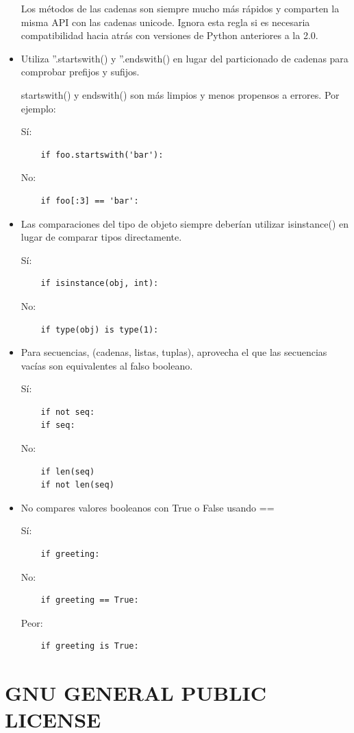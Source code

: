 \documentclass[a4paper,11pt,oneside]{book}
\begin{document}
\begin{itemize}
Los métodos de las cadenas son siempre mucho más rápidos y comparten la misma API con las cadenas unicode. Ignora esta regla si es necesaria compatibilidad hacia atrás con versiones de Python anteriores a la 2.0.

\item Utiliza ''.startswith() y ''.endswith() en lugar del particionado de cadenas para comprobar prefijos y sufijos.

startswith() y endswith() son más limpios y menos propensos a errores. Por ejemplo:

Sí:
\begin{lstlisting}
    if foo.startswith('bar'):
\end{lstlisting}
No:
\begin{lstlisting}
    if foo[:3] == 'bar':
\end{lstlisting}
\item Las comparaciones del tipo de objeto siempre deberían utilizar isinstance() en lugar de comparar tipos directamente.

Sí:
\begin{lstlisting}
    if isinstance(obj, int):
\end{lstlisting}
No:
\begin{lstlisting}
    if type(obj) is type(1):
\end{lstlisting}

\item Para secuencias, (cadenas, listas, tuplas), aprovecha el que las secuencias vacías son equivalentes al falso booleano.

Sí:
\begin{lstlisting}
    if not seq:
    if seq:
\end{lstlisting}
No:
\begin{lstlisting}
    if len(seq)
    if not len(seq)
\end{lstlisting}
\item No compares valores booleanos con True o False usando ==

Sí:
\begin{lstlisting}
    if greeting:
\end{lstlisting}
No:
\begin{lstlisting}
    if greeting == True:
\end{lstlisting}
Peor:
\begin{lstlisting}
    if greeting is True:
\end{lstlisting}
\end{itemize}

\chapter{GNU GENERAL PUBLIC LICENSE}
\end{document}
